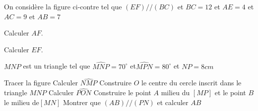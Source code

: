 \documentclass[a4paper,addpoints,12pt]{exam}
\begin{document}
\devoir[ds=true,num=3 ,niv=2 ,date=12/01/2023,prv=false ]

\begin{exo}[6]
\begin{minipage}{0.6\linewidth}
On considère la figure ci-contre tel que $(EF) // (BC)$  et $BC=12$ et $AE=4$ et $AC=9$ et $AB=7$
\begin{questions}
\question[3] Calculer  $AF$.
\end{questions}
\end{minipage}
\begin{minipage}{0.4\linewidth}
\end{minipage}
\begin{questions}
\setcounter{question}{1}
\question[3] Calculer  $EF$.
\end{questions}
\end{exo}

\begin{exo}[14]
$MNP$ est un triangle tel que  $\widehat{MNP}=70^{\circ}$ et$\widehat{MPN}=80^{\circ}$ et $NP=8 cm$
\begin{questions}
\question[4] Tracer la figure
\question[2] Calculer $\widehat{NMP}$
\question[2] Construire  $O$ le centre du cercle inscrit dans le triangle $MNP$
\question[2] Calculer $\widehat{PON}$
\question[2] Construire le point  $A$ milieu du  $[MP]$ et le point $B$ le milieu de$[MN]$
\question[2] Montrer que $(AB) // (PN)$ et calculer $AB$
\end{questions}
\end{exo}
\end{document}
